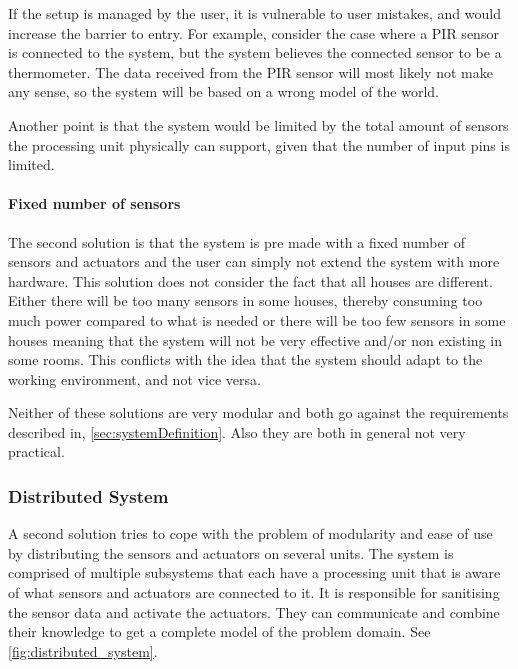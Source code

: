If the setup is managed by the user, it is vulnerable to user mistakes, and would increase the barrier to entry. For example, consider the case where a PIR sensor is connected to the system, but the system believes the connected sensor to be a thermometer. The data received from the PIR sensor will most likely not make any sense, so the system will be based on a wrong model of the world.

Another point is that the system would be limited by the total amount of sensors the processing unit physically can support, given that the number of input pins is limited.

\paragraph{Fixed number of sensors}
The second solution is that the system is pre made with a fixed number of sensors and actuators and the user can simply not extend the system with more hardware. This solution does not consider the fact that all houses are different. Either there will be too many sensors in some houses, thereby consuming too much power compared to what is needed or there will be too few sensors in some houses meaning that the system will not be very effective and/or non existing in some rooms. This conflicts with the idea that the system should adapt to the working environment, and not vice versa.

Neither of these solutions are very modular and both go against the requirements described in, \cref{sec:systemDefinition}. Also they are both in general not very practical.

\subsubsection{Distributed System}
A second solution tries to cope with the problem of modularity and ease of use by distributing the sensors and actuators on several units. The system is comprised of multiple subsystems that each have a processing unit that is aware of what sensors and actuators are connected to it. It is responsible for sanitising the sensor data and activate the actuators. They can communicate and combine their knowledge to get a complete model of the problem domain. See \cref{fig:distributed_system}.

